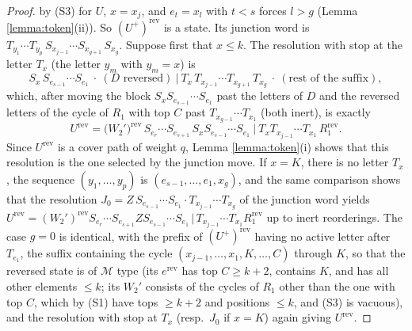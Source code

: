 \documentclass{amsart}
\theoremstyle{definition}
\theoremstyle{remark}
\numberwithin{equation}{section}
\begin{document}
\begin{proof}
by (S3) for $U$, $x=x_j$, and $e_t=x_l$ with $t<s$ forces $l>g$ (Lemma \ref{lemma:token}(ii)). So $(U^+)^{\mathrm{rev}}$ is a state. Its junction word is $T_{y_1}\cdots T_{y_p}\,S_{x_{j-1}}\cdots S_{x_{g+1}}\,S_{x_g}$. Suppose first that $x\leq k$. The resolution with stop at the letter $T_x$ (the letter $y_m$ with $y_m=x$) is
$$S_x\,S_{e_{s-1}}\cdots S_{e_1}\ \cdot\ (D\text{ reversed})\ \big|\ T_x\,T_{x_{j-1}}\cdots T_{x_{g+1}}\,T_{x_g}\ \cdot\ (\text{rest of the suffix}),$$
which, after moving the block $S_xS_{e_{s-1}}\cdots S_{e_1}$ past the letters of $D$ and the reversed letters of the cycle of $R_1$ with top $C$ past $T_{x_{g-1}}\cdots T_{x_1}$ (both inert), is exactly
$$U^{\mathrm{rev}}=\big(W_2'\big)^{\mathrm{rev}}\,S_{e_r}\cdots S_{e_{s+1}}\,S_xS_{e_{s-1}}\cdots S_{e_1}\ \big|\ T_xT_{x_{j-1}}\cdots T_{x_1}\,R_1^{\mathrm{rev}}.$$
Since $U^{\mathrm{rev}}$ is a cover path of weight $q$, Lemma \ref{lemma:token}(i) shows that this resolution is the one selected by the junction move. If $x=K$, there is no letter $T_x$, the sequence $(y_1,\ldots,y_p)$ is $(e_{s-1},\ldots,e_1,x_g)$, and the same comparison shows that the resolution $J_0=Z\,S_{e_{s-1}}\cdots S_{e_1}\cdot T_{x_{j-1}}\cdots T_{x_g}$ of the junction word yields $U^{\mathrm{rev}}=(W_2')^{\mathrm{rev}}S_{e_r}\cdots S_{e_{s+1}}ZS_{e_{s-1}}\cdots S_{e_1}\,|\,T_{x_{j-1}}\cdots T_{x_1}R_1^{\mathrm{rev}}$ up to inert reorderings. The case $g=0$ is identical, with the prefix of $(U^+)^{\mathrm{rev}}$ having no active letter after $T_{e_1}$, the suffix containing the cycle $(x_{j-1},\ldots,x_1,K,\ldots,C)$ through $K$, so that the reversed state is of $\mathcal M$ type (its $e^{\mathrm{rev}}$ has top $C\geq k+2$, contains $K$, and has all other elements $\leq k$; its $W_2'$ consists of the cycles of $R_1$ other than the one with top $C$, which by (S1) have tops $\geq k+2$ and positions $\leq k$, and (S3) is vacuous), and the resolution with stop at $T_x$ (resp.\ $J_0$ if $x=K$) again giving $U^{\mathrm{rev}}$.
\end{proof}
\end{document}
